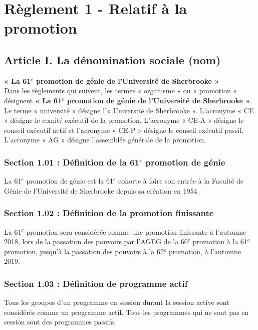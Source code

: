 \section*{Règlement 1 - Relatif à la promotion} 

\subsection*{Article I. La dénomination sociale (nom)}
\textbf{« La 61$^e$ promotion de génie de l’Université de Sherbrooke »}\\

Dans les règlements qui suivent, les termes « organisme » ou « promotion » désignent \textbf{« La 61$^e$ promotion de génie de l’Université de Sherbrooke »}. Le terme « université » désigne l’« Université de Sherbrooke ». L’acronyme « CE » désigne le comité exécutif de la promotion. L’acronyme « CE-A » désigne le conseil exécutif actif et l’acronyme « CE-P » désigne le conseil exécutif passif. L’acronyme « AG » désigne l’assemblée générale de la promotion.

\subsubsection*{Section 1.01 : Définition de la 61$^e$ promotion de génie}
La 61$^e$ promotion de génie est la 61$^e$ cohorte à faire son entrée à la Faculté de Génie de l’Université de Sherbrooke depuis sa création en 1954. 

\subsubsection*{Section 1.02 : Définition de la promotion finissante}
La 61$^e$ promotion sera considérée comme une promotion finissante à l’automne 2018, lors de la passation des pouvoirs par l’AGEG de la 60$^e$ promotion à la 61$^e$ promotion, jusqu’à la passation des pouvoirs à la 62$^e$ promotion, à l’automne 2019. 

\subsubsection*{Section 1.03 : Définition de programme actif}
Tous les groupes d’un programme en session durant la session active sont considérés comme un programme actif. Tous les programmes qui ne sont pas en session sont des programmes passifs.

